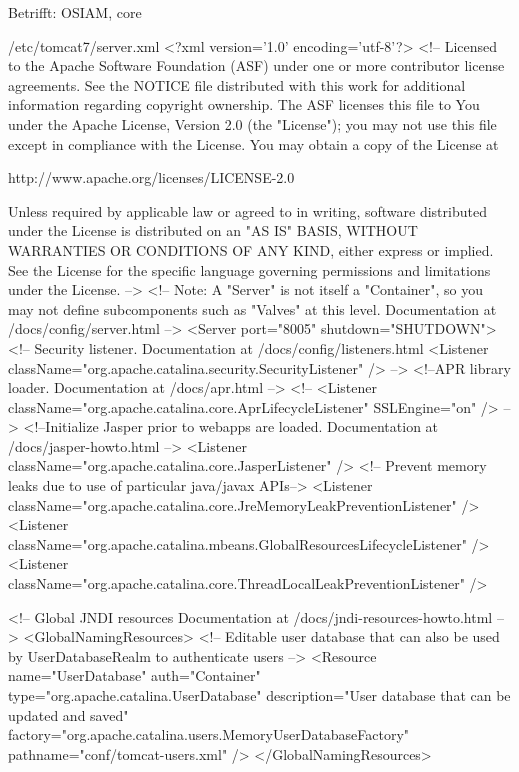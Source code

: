 \ifoa
Betrifft: OSIAM, core
\fi%

\begin{lstdump}[basicstyle=\ttfamily\footnotesize]{/etc/tomcat7/server.xml}
<?xml version='1.0' encoding='utf-8'?>
<!--
  Licensed to the Apache Software Foundation (ASF) under one or more
  contributor license agreements.  See the NOTICE file distributed with
  this work for additional information regarding copyright ownership.
  The ASF licenses this file to You under the Apache License, Version 2.0
  (the "License"); you may not use this file except in compliance with
  the License.  You may obtain a copy of the License at

      http://www.apache.org/licenses/LICENSE-2.0

  Unless required by applicable law or agreed to in writing, software
  distributed under the License is distributed on an "AS IS" BASIS,
  WITHOUT WARRANTIES OR CONDITIONS OF ANY KIND, either express or implied.
  See the License for the specific language governing permissions and
  limitations under the License.
-->
<!-- Note:  A "Server" is not itself a "Container", so you may not
     define subcomponents such as "Valves" at this level.
     Documentation at /docs/config/server.html
 -->
<Server port="8005" shutdown="SHUTDOWN">
  <!-- Security listener. Documentation at /docs/config/listeners.html
  <Listener className="org.apache.catalina.security.SecurityListener" />
  -->
  <!--APR library loader. Documentation at /docs/apr.html -->
  <!--
  <Listener className="org.apache.catalina.core.AprLifecycleListener" SSLEngine="on" />
  -->
  <!--Initialize Jasper prior to webapps are loaded. Documentation at /docs/jasper-howto.html -->
  <Listener className="org.apache.catalina.core.JasperListener" />
  <!-- Prevent memory leaks due to use of particular java/javax APIs-->
  <Listener className="org.apache.catalina.core.JreMemoryLeakPreventionListener" />
  <Listener className="org.apache.catalina.mbeans.GlobalResourcesLifecycleListener" />
  <Listener className="org.apache.catalina.core.ThreadLocalLeakPreventionListener" />

  <!-- Global JNDI resources
       Documentation at /docs/jndi-resources-howto.html
  -->
  <GlobalNamingResources>
    <!-- Editable user database that can also be used by
         UserDatabaseRealm to authenticate users
    -->
    <Resource name="UserDatabase" auth="Container"
              type="org.apache.catalina.UserDatabase"
              description="User database that can be updated and saved"
              factory="org.apache.catalina.users.MemoryUserDatabaseFactory"
              pathname="conf/tomcat-users.xml" />
  </GlobalNamingResources>


\end{lstdump}
